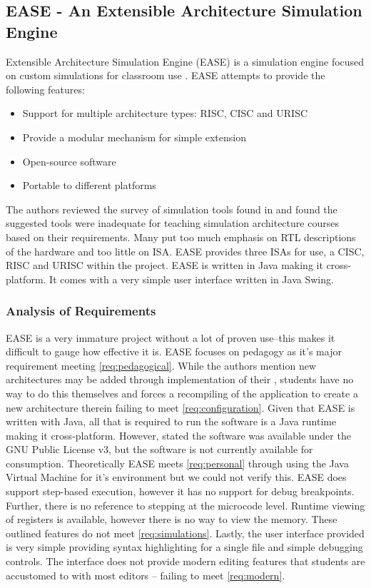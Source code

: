 \subsection{EASE - An Extensible Architecture Simulation Engine}
\label{sec:review-ease}

Extensible Architecture Simulation Engine (EASE) is a simulation engine focused on custom simulations for classroom use \cite{Skillen2011}. EASE attempts to provide the following features: 
\begin{itemize}
    \item Support for multiple architecture types: RISC, CISC and URISC
    \item Provide a modular mechanism for simple extension
    \item Open-source software
    \item Portable to different platforms
\end{itemize}
The authors \cite{Skillen2011} reviewed the survey of simulation tools found in \cite{Nikolic2009} and found the suggested tools were inadequate for teaching simulation architecture courses based on their requirements. Many put too much emphasis on RTL descriptions of the hardware and too little on ISA. EASE provides three ISAs for use, a CISC, RISC and URISC within the project. EASE is written in Java making it cross-platform. It comes with a very simple user interface written in Java Swing. 

\subsubsection*{Analysis of Requirements}

EASE is a very immature project without a lot of proven use--this makes it difficult to gauge how effective it is. EASE focuses on pedagogy as it's major requirement meeting \cref{req:pedagogical}. While the authors mention new architectures may be added through implementation of their , students have no way to do this themselves and forces a recompiling of the application to create a new architecture therein failing to meet \cref{req:configuration}. Given that EASE is written with Java, all that is required to run the software is a Java runtime making it cross-platform. However, \cite{Skillen2011} stated the software was available under the GNU Public License v3, but the software is not currently available for consumption. Theoretically EASE meets \cref{req:personal} through using the Java Virtual Machine for it's environment but we could not verify this. EASE does support step-based execution, however it has no support for debug breakpoints. Further, there is no reference to stepping at the microcode level. Runtime viewing of registers is available, however there is no way to view the memory. These outlined features do not meet \cref{req:simulations}. Lastly, the user interface provided is very simple providing syntax highlighting for a single file and simple debugging controls. The interface does not provide modern editing features that students are accustomed to with most editors -- failing to meet \cref{req:modern}.

